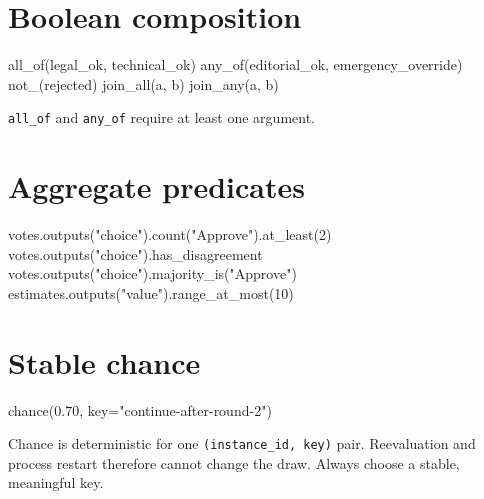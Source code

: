 \documentclass[
  10pt,
]{report}
\newenvironment{Shaded}{}{}
\newcommand{\DecValTok}[1]{\textcolor[rgb]{0.25,0.63,0.44}{#1}}
\newcommand{\FloatTok}[1]{\textcolor[rgb]{0.25,0.63,0.44}{#1}}
\newcommand{\NormalTok}[1]{#1}
\newcommand{\OperatorTok}[1]{\textcolor[rgb]{0.40,0.40,0.40}{#1}}
\newcommand{\StringTok}[1]{\textcolor[rgb]{0.25,0.44,0.63}{#1}}
\begin{document}
\section{Boolean composition}\label{boolean-composition}

\begin{Shaded}
\begin{Highlighting}[]
\NormalTok{all\_of(legal\_ok, technical\_ok)}
\NormalTok{any\_of(editorial\_ok, emergency\_override)}
\NormalTok{not\_(rejected)}
\NormalTok{join\_all(a, b)}
\NormalTok{join\_any(a, b)}
\end{Highlighting}
\end{Shaded}

\texttt{all\_of} and \texttt{any\_of} require at least one argument.

\section{Aggregate predicates}\label{aggregate-predicates}

\begin{Shaded}
\begin{Highlighting}[]
\NormalTok{votes.outputs(}\StringTok{"choice"}\NormalTok{).count(}\StringTok{"Approve"}\NormalTok{).at\_least(}\DecValTok{2}\NormalTok{)}
\NormalTok{votes.outputs(}\StringTok{"choice"}\NormalTok{).has\_disagreement}
\NormalTok{votes.outputs(}\StringTok{"choice"}\NormalTok{).majority\_is(}\StringTok{"Approve"}\NormalTok{)}
\NormalTok{estimates.outputs(}\StringTok{"value"}\NormalTok{).range\_at\_most(}\DecValTok{10}\NormalTok{)}
\end{Highlighting}
\end{Shaded}

\section{Stable chance}\label{stable-chance}

\begin{Shaded}
\begin{Highlighting}[]
\NormalTok{chance(}\FloatTok{0.70}\NormalTok{, key}\OperatorTok{=}\StringTok{"continue{-}after{-}round{-}2"}\NormalTok{)}
\end{Highlighting}
\end{Shaded}

Chance is deterministic for one \texttt{(instance\_id,\ key)} pair.
Reevaluation and process restart therefore cannot change the draw.
Always choose a stable, meaningful key.
\end{document}
